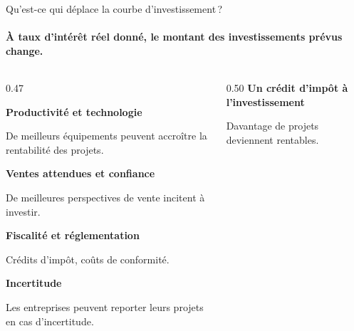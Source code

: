 \documentclass[aspectratio=169]{beamer}
\begin{document}
\begin{frame}{Qu'est-ce qui déplace la courbe d'investissement\,?}\examtag
   \framesubtitle{À taux d'intérêt réel donné, le montant des investissements prévus change.}
   \begin{columns}[c,onlytextwidth]
      \begin{column}{0.47\textwidth}
         \begin{tcolorbox}[colback=HECcoral!6, colframe=HECcoral!6, boxrule=0pt, arc=7pt, left=9pt, right=9pt, top=7pt, bottom=7pt, before skip=0pt, after skip=0pt]
            \RaggedRight\footnotesize{}
            \textbf{\textcolor{HECcoral}{Productivité et technologie}}\par
            De meilleurs équipements peuvent accroître la rentabilité des projets.\par\smallskip
            \textbf{\textcolor{HECcoral}{Ventes attendues et confiance}}\par
            De meilleures perspectives de vente incitent à investir.\par\smallskip
            \textbf{\textcolor{HECcoral}{Fiscalité et réglementation}}\par
            Crédits d'impôt, coûts de conformité.\par\smallskip
            \textbf{\textcolor{HECcoral}{Incertitude}}\par
            Les entreprises peuvent reporter leurs projets en cas d'incertitude.
         \end{tcolorbox}
      \end{column}
      \begin{column}{0.50\textwidth}
         \centering
         {\small\bfseries\textcolor{HECnavy}{Un crédit d'impôt à l'investissement}}\par\smallskip
         \par\smallskip
         {\footnotesize Davantage de projets deviennent rentables.\par}
      \end{column}
   \end{columns}
\end{frame}
\end{document}
